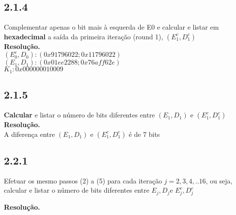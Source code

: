 \documentclass[12pt,letterpaper]{article}
\newcommand\answer{\textbf{Resolução.}\xspace}
\begin{document}
\subsection*{2.1.4}
Complementar apenas o bit mais à esquerda de E0 e calcular e listar em \textbf{hexadecimal} a saída da primeira iteração (round 1), $(E_1^c ,D_1^c)$ \\
\answer \\ 
$(E_0^c, D_0): (0x91796022; 0x11796022)$\\
$(E_1, D_1): (0x01ee2288; 0x76aff62e)$\\
$K_1  : 0x000000010009$

\subsection*{2.1.5}
\textbf{Calcular} e listar o número de bits diferentes entre $(E_1,D_1)$ e $(E_1^c ,D_1^c)$ \\
\answer \\

A diferença entre $(E_1, D_1)$ e $(E_1^c, D_1^c)$ é de 7 bits

\subsection*{2.2.1}
Efetuar os mesmo passos (2) a (5) para cada iteração $j = 2,3,4,..16$, ou seja, calcular e listar o número de bits diferentes entre $E_j,D_j$e $E_j^c,D_j^c$

\answer
\end{document}
